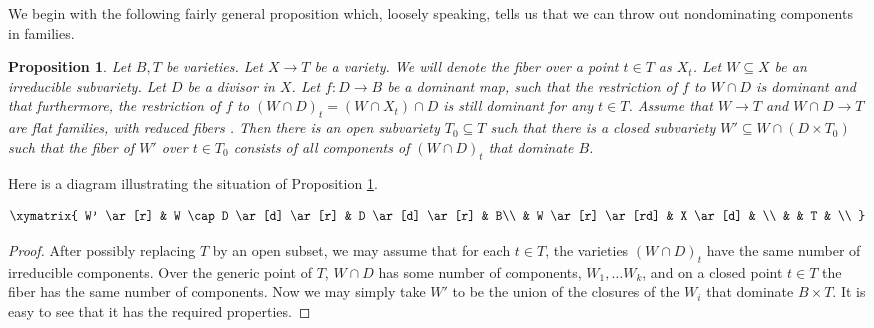 \documentclass[12pt]{amsart}
\numberwithin{equation}{section}
\newtheorem{proposition}[theorem]{Proposition}
\numberwithin{theorem}{section}
\theoremstyle{definition}
\theoremstyle{definition}
\begin{document}
We begin with the following fairly general proposition which, loosely speaking, tells us that we can throw out nondominating components in families.
\begin{proposition}\label{famgen}
    Let  $B, T$ be   varieties. Let $X \to T$ be a variety. We will denote the fiber over a point $t \in T$ as $X_t$.
    Let $W \subseteq X$ be an irreducible subvariety. Let $D$ be a divisor in $X$. Let $f : D \to B$ be a dominant map, such that the restriction  of $f$ to $W \cap D$ is  dominant and that furthermore, the restriction of $f$ to  $ (W \cap D)_t = (W \cap X_t) \cap D$ is still dominant for any $t \in T$.
    Assume that $W \to T$ and $W \cap D \to T$ are flat families, with reduced fibers . Then there is an open subvariety $T_0 \subseteq T$  such that  there is a closed subvariety $W' \subseteq W \cap (D \times T_0)$  such that the fiber of $W'$ over $t\in T_0$ consists of all components of $(W \cap D)_t$ that dominate $B$.
\end{proposition}
Here is a diagram illustrating the situation of Proposition \ref{famgen}.

\[
\xymatrix{
W' \ar [r] & W \cap D \ar[d] \ar[r] & D \ar[d] \ar[r] & B\\
& W \ar[r] \ar[rd] & X \ar[d] & \\
& & T & \\
}
\]
\begin{proof}



    After possibly replacing $T$ by an open subset, we may assume that for each $t \in T $, the varieties $(W \cap D)_t$ have the same number of irreducible components. Over the generic point of $T$,  $W \cap D$ has some number of components, $W_1 , \dots W_k$, and on a closed point  $t\in T$ the fiber has the same number of components. Now we may simply take $W'$ to be the union of the closures of the $W_i$ that dominate $B \times T.$ It is easy to see that it has the required properties.
\end{proof}
\end{document}
